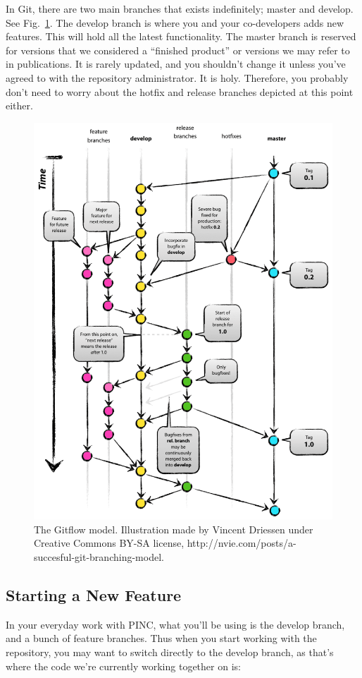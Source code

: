 \documentclass[10pt,a4paper]{article}
\newcommand{\reffig}[1]{Fig.~\ref{fig:#1}}
\begin{document}
In Git, there are two main branches that exists indefinitely; master and develop. See \reffig{gitflow}. The develop branch is where you and your co-developers adds new features. This will hold all the latest functionality. The master branch is reserved for versions that we considered a ``finished product'' or versions we may refer to in publications. It is rarely updated, and you shouldn't change it unless you've agreed to with the repository administrator. It is holy. Therefore, you probably don't need to worry about the hotfix and release branches depicted at this point either.
\begin{figure}
	\centering
	\includegraphics[width=\textwidth]{git-model.png}
	\caption{The Gitflow model. Illustration made by Vincent Driessen under Creative Commons BY-SA license, http://nvie.com/posts/a-succesful-git-branching-model.}
	\label{fig:gitflow}
\end{figure}

\subsection{Starting a New Feature}
In your everyday work with PINC, what you'll be using is the develop branch, and a bunch of feature branches. Thus when you start working with the repository, you may want to switch directly to the develop branch, as that's where the code we're currently working together on is:
\end{document}
